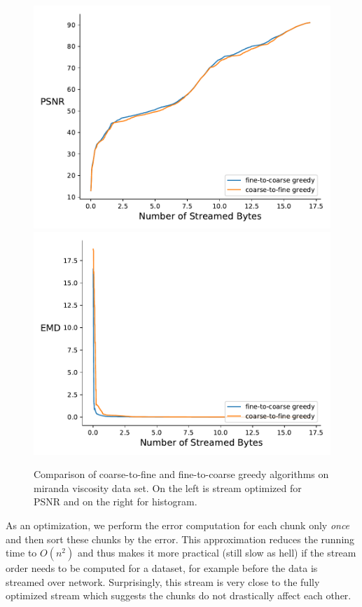 \begin{figure}
        \centering
        \includegraphics[width=0.48\linewidth]{img/figure5/rmse-miranda-viscosity}
        \includegraphics[width=0.48\linewidth]{img/figure5/histogram-miranda-viscosity}
        \caption{Comparison of coarse-to-fine and fine-to-coarse greedy algorithms on miranda viscosity data set.
                 On the left is stream optimized for PSNR and on the right for histogram.}
\end{figure}


As an optimization, we perform the error computation for each chunk only {\em once} and then sort these chunks
by the error. This approximation reduces the running time to $O(n^2)$ and thus makes it more practical (still
slow as hell) if
the stream order needs to be computed for a dataset, for example before the data is streamed over network.
Surprisingly, this stream is very close to the fully optimized stream which suggests the chunks do not drastically
affect each other.



